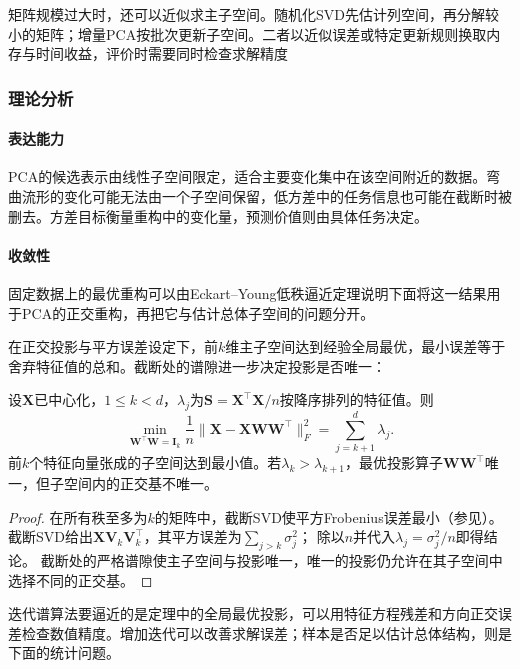 矩阵规模过大时，还可以近似求主子空间。随机化SVD先估计列空间，再分解较小的矩阵；增量PCA按批次更新子空间。二者以近似误差或特定更新规则换取内存与时间收益，评价时需要同时检查求解精度

\subsubsection{理论分析}
\label{sec:dim-pca-theory}

\paragraph{表达能力}
PCA的候选表示由线性子空间限定，适合主要变化集中在该空间附近的数据。弯曲流形的变化可能无法由一个子空间保留，低方差中的任务信息也可能在截断时被删去。方差目标衡量重构中的变化量，预测价值则由具体任务决定。

\paragraph{收敛性}

固定数据上的最优重构可以由Eckart--Young低秩逼近定理说明下面将这一结果用于PCA的正交重构，再把它与估计总体子空间的问题分开。

在正交投影与平方误差设定下，前$k$维主子空间达到经验全局最优，最小误差等于舍弃特征值的总和。截断处的谱隙进一步决定投影是否唯一：

\begin{theorem}[PCA的最优线性重构性质]
  \label{thm:dim-pca-optimal}
  设$\bm{X}$已中心化，$1\leq k<d$，$\lambda_j$为$\bm{S}=\bm{X}^{\top}\bm{X}/n$按降序排列的特征值。则
  \[
    \min_{\bm{W}^{\top}\bm{W}=\bm{I}_k}
       \frac1n\lVert\bm{X}-\bm{X}\bm{W}\bm{W}^{\top}\rVert_F^2
       =\sum_{j=k+1}^{d}\lambda_j.
  \]
  前$k$个特征向量张成的子空间达到最小值。若$\lambda_k>\lambda_{k+1}$，最优投影算子$\bm{W}\bm{W}^{\top}$唯一，但子空间内的正交基不唯一。
\end{theorem}

\begin{proof}
在所有秩至多为$k$的矩阵中，截断SVD使平方Frobenius误差最小（参见）。
截断SVD给出$\bm X\bm V_k\bm V_k^\top$，其平方误差为$\sum_{j>k}\sigma_j^2$；
除以$n$并代入$\lambda_j=\sigma_j^2/n$即得结论。
截断处的严格谱隙使主子空间与投影唯一，唯一的投影仍允许在其子空间中选择不同的正交基。
\end{proof}

迭代谱算法要逼近的是定理中的全局最优投影，可以用特征方程残差和方向正交误差检查数值精度。增加迭代可以改善求解误差；样本是否足以估计总体结构，则是下面的统计问题。

